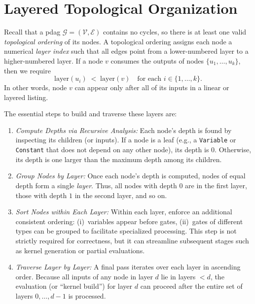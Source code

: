 
\section{Layered Topological Organization}
\label{sec:layered_dag_traversal}

Recall that a \acrshort{pdag} \(\mathcal{G} = (\mathcal{V}, \mathcal{E})\) contains no cycles, so there is at least one valid \emph{topological ordering} of its nodes.  A topological ordering assigns each node a numerical \emph{layer index} such that all edges point from a lower-numbered layer to a higher-numbered layer. If a node \(v\) consumes the outputs of nodes \(\{u_1,\dots,u_k\}\), then we require
\[
\text{layer}(u_i) \;<\; \text{layer}(v)
\quad
\text{for each }i\in\{1,\dots,k\}.
\]
In other words, node \(v\) can appear only after all of its inputs in a linear or layered listing.

The essential steps to build and traverse these layers are:

\begin{enumerate}
    \item \emph{Compute Depths via Recursive Analysis:}  
      Each node's depth is found by inspecting its children (or inputs).  If a node is a leaf (e.g., a \texttt{Variable} or \texttt{Constant} that does not depend on any other node), its depth is 0.  Otherwise, its depth is one larger than the maximum depth among its children.  

    \item \emph{Group Nodes by Layer:}  
      Once each node's depth is computed, nodes of equal depth form a single \emph{layer}. Thus, all nodes with depth \(0\) are in the first layer, those with depth \(1\) in the second layer, and so on.  

    \item \emph{Sort Nodes within Each Layer:}  
      Within each layer, enforce an additional consistent ordering: (i)~variables appear before gates, (ii)~gates of different types can be grouped to facilitate specialized processing.  This step is not strictly required for correctness, but it can streamline subsequent stages such as kernel generation or partial evaluations.

    \item \emph{Traverse Layer by Layer:}  
      A final pass iterates over each layer in ascending order.  Because all inputs of any node in layer \(d\) lie in layers \(< d\), the evaluation (or “kernel build”) for layer \(d\) can proceed after the entire set of layers \(0,\dots,d-1\) is processed.
\end{enumerate}

